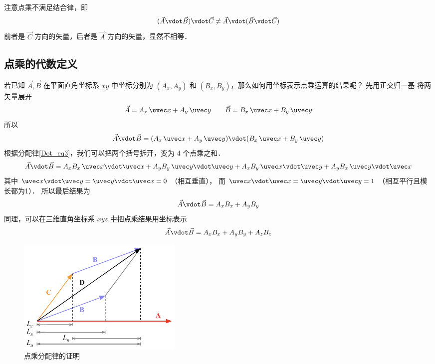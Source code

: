 注意点乘不满足结合律，即
\begin{equation}
(\vec A \vdot \vec B) \vdot \vec C \ne  \vec A \vdot (\vec B \vdot \vec C)
\end{equation}
前者是 $\vec C$ 方向的矢量，后者是 $\vec A$ 方向的矢量，显然不相等．

\subsection{点乘的代数定义}
若已知 $\vec A, \vec B$ 在平面直角坐标系 $xy$ 中坐标分别为 $(A_x, A_y)$ 和  $(B_x, B_y)$，那么如何用坐标表示点乘运算的结果呢？ 先用正交归一基 将两矢量展开 %
\begin{equation}
\vec A = A_x \,\uvec x + A_y \,\uvec y \qquad \vec B = B_x \,\uvec x + B_y \,\uvec y
\end{equation}
所以
\begin{equation}
\vec A \vdot \vec B = (A_x \,\uvec x + A_y \,\uvec y) \vdot (B_x \,\uvec x + B_y \,\uvec y)
\end{equation}
根据分配律\autoref{Dot_eq3}，我们可以把两个括号拆开，变为 4 个点乘之和． 
\begin{equation}
\vec A \vdot \vec B = A_x B_x \,\uvec x \vdot \uvec x + A_y B_y \,\uvec y \vdot \uvec y + A_x B_y \,\uvec x \vdot \uvec y + A_y B_x \,\uvec y \vdot \uvec x
\end{equation}
其中 $\uvec x \vdot \uvec y = \uvec y \vdot \uvec x = 0$ （相互垂直）， 而 $\uvec x \vdot \uvec x = \uvec y \vdot \uvec y = 1$ （相互平行且模长都为1）． 所以最后结果为
\begin{equation}
\vec A \vdot \vec B = A_x B_x + A_y B_y
\end{equation}
同理，可以在三维直角坐标系 $xyz$ 中把点乘结果用坐标表示
\begin{equation}
\vec A \vdot \vec B = A_x B_x + A_y B_y + A_z B_z	
\end{equation}

\begin{figure}[ht]
\centering
\includegraphics[width=8cm]{./figures/Dot2.pdf}
\caption{点乘分配律的证明} \label{Dot_fig2}
\end{figure}


